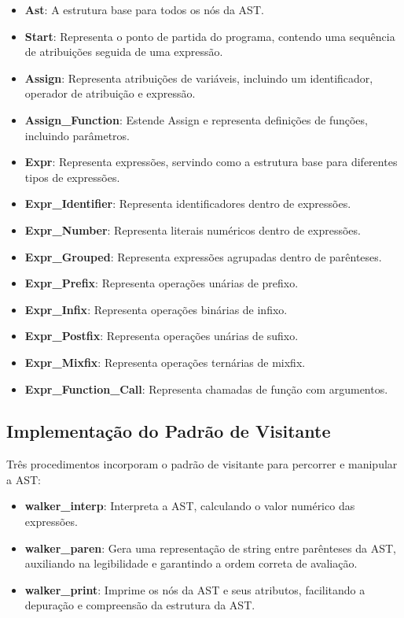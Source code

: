 \documentclass[english, 
               brazil, 
               bsc] %
               {dcomp-abntex2}
\begin{document}
\begin{itemize}
\item \textbf{Ast}: A estrutura base para todos os nós da AST.
\item \textbf{Start}: Representa o ponto de partida do programa, contendo uma sequência de atribuições seguida de uma expressão.
\item \textbf{Assign}: Representa atribuições de variáveis, incluindo um identificador, operador de atribuição e expressão.
\item \textbf{Assign\_Function}: Estende Assign e representa definições de funções, incluindo parâmetros.
\item \textbf{Expr}: Representa expressões, servindo como a estrutura base para diferentes tipos de expressões.
\item \textbf{Expr\_Identifier}: Representa identificadores dentro de expressões.
\item \textbf{Expr\_Number}: Representa literais numéricos dentro de expressões.
\item \textbf{Expr\_Grouped}: Representa expressões agrupadas dentro de parênteses.
\item \textbf{Expr\_Prefix}: Representa operações unárias de prefixo.
\item \textbf{Expr\_Infix}: Representa operações binárias de infixo.
\item \textbf{Expr\_Postfix}: Representa operações unárias de sufixo.
\item \textbf{Expr\_Mixfix}: Representa operações ternárias de mixfix.
\item \textbf{Expr\_Function\_Call}: Representa chamadas de função com argumentos.

\end{itemize}

\subsection{Implementação do Padrão de Visitante}

Três procedimentos incorporam o padrão de visitante para percorrer e manipular a AST:

\begin{itemize}
  \item \textbf{walker\_interp}: Interpreta a AST, calculando o valor numérico das expressões.
  \item \textbf{walker\_paren}: Gera uma representação de string entre parênteses da AST, auxiliando na legibilidade e garantindo a ordem correta de avaliação.
  \item \textbf{walker\_print}: Imprime os nós da AST e seus atributos, facilitando a depuração e compreensão da estrutura da AST.
\end{itemize}
\end{document}
